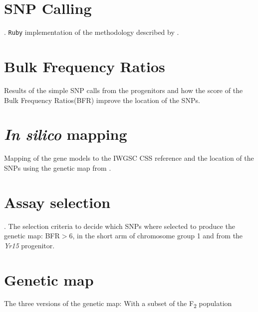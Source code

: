 

\section{SNP Calling}. 
\verb|Ruby| implementation of the methodology described by \citet{Trick2012}. 

\section{Bulk Frequency Ratios} 
Results of the simple SNP calls from the progenitors and how the score of the Bulk Frequency Ratios(BFR) improve the location of the SNPs. 

\section{\textit{In silico} mapping}
Mapping of the gene models to the IWGSC CSS \cite{Mayer2014} reference and the location of the SNPs using the genetic map from \citet{Wang2014}.

\section{Assay selection}. 
The selection criteria to decide which SNPs where selected to produce the genetic map: BFR$>$6, in the short arm of chromosome group 1 and from the \textit{Yr15} progenitor.

\section{Genetic map} 
\label{yr15:geneticMap}
The three versions of the genetic map: With a subset of the F\textsubscript{2} population

